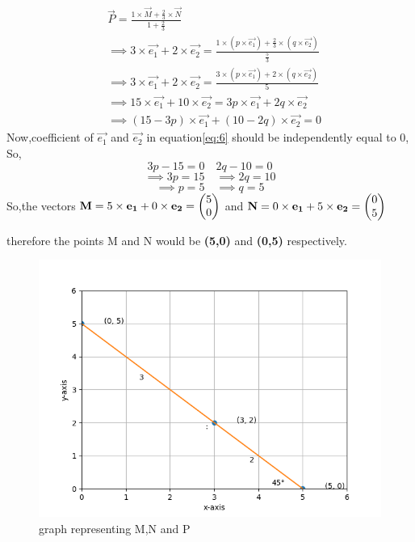 \documentclass[journal,12pt,twocolumn]{IEEEtran}
\begin{document}
\begin{align}
    &\vec{P}=\frac{1\times \vec{M}+\frac{2}{3}\times \vec{N}}{1+\frac{2}{3}}\\
    &\implies  3\times\vec{e_1}+2\times\vec{e_2} =\frac{1\times (p\times \vec{e_1})+\frac{2}{3}\times (q\times\vec{e_2})}{\frac{5}{3}}\\
   &\implies 3\times\vec{e_1}+2\times\vec{e_2}=\frac{3\times (p\times\vec{e_1})+2\times (q\times\vec{e_2})}{5}\\
  &\implies 15\times\vec{e_1}+10\times\vec{e_2}=3p\times\vec{e_1}+2q\times\vec{e_2}\\
\label{eq:6}
 &\implies (15-3p)\times \vec{e_1}+(10-2q)\times\vec{e_2}=0
\end{align}
Now,coefficient of $\vec{e_1}$ and $\vec{e_2}$ in equation\eqref{eq:6} should be independently equal to 0,
So,
\begin{equation*}
3p-15=0\quad 2q-10=0
\end{equation*}
\begin{equation*}
 \implies3p=15\quad  \implies2q=10
\end{equation*}
\begin{equation}
 \implies p=5\quad \implies q=5      
\end{equation}
So,the vectors $\mathbf{M}=5\times\mathbf{e_1}+0\times\mathbf{e_2}=\begin{pmatrix}5\\0\end{pmatrix}$ and $ \mathbf{N}=0\times\mathbf{e_1}+5\times\mathbf{e_2}=\begin{pmatrix}0\\5\end{pmatrix}$ 
 
therefore the points M and N would be \textbf{(5,0)} and \textbf{(0,5)} respectively.
\begin{figure}[htb!]
\centering
\includegraphics{figures/Figure_1(1).png}
\caption{graph representing M,N and P}
\end{figure}
\end{document}
